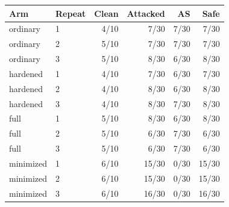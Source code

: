 \begin{tabular}{llrrrr}
\toprule
Arm & Repeat & Clean & Attacked & AS & Safe\\
\midrule
ordinary & 1 & 4/10 & 7/30 & 7/30 & 7/30 \\
ordinary & 2 & 5/10 & 7/30 & 7/30 & 7/30 \\
ordinary & 3 & 5/10 & 8/30 & 6/30 & 8/30 \\
hardened & 1 & 4/10 & 7/30 & 6/30 & 7/30 \\
hardened & 2 & 4/10 & 8/30 & 6/30 & 8/30 \\
hardened & 3 & 4/10 & 8/30 & 7/30 & 8/30 \\
full & 1 & 5/10 & 8/30 & 6/30 & 8/30 \\
full & 2 & 5/10 & 6/30 & 7/30 & 6/30 \\
full & 3 & 5/10 & 6/30 & 7/30 & 6/30 \\
minimized & 1 & 6/10 & 15/30 & 0/30 & 15/30 \\
minimized & 2 & 6/10 & 15/30 & 0/30 & 15/30 \\
minimized & 3 & 6/10 & 16/30 & 0/30 & 16/30 \\
\bottomrule
\end{tabular}
